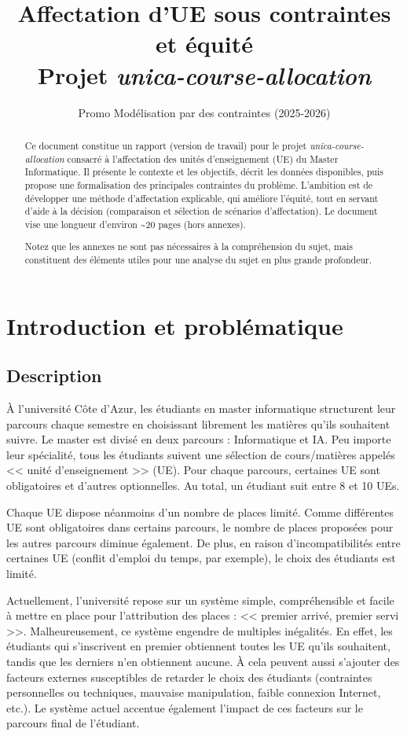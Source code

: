 \documentclass{rapport}
\title{Affectation d'UE sous contraintes et équité\\Projet \emph{unica-course-allocation}}
\author{Promo Modélisation par des contraintes (2025-2026)}
\date{}
\theoremstyle{definition}
\theoremstyle{remark}
\theoremstyle{plain}
\theoremstyle{definition}
\theoremstyle{definition}
\theoremstyle{remark}
\theoremstyle{definition}
\begin{document}
\maketitle

\begin{abstract}
Ce document constitue un rapport (version de travail) pour le projet \emph{unica-course-allocation} consacré à l'affectation des unités d'enseignement (UE) du Master Informatique.
Il présente le contexte et les objectifs, décrit les données disponibles, puis propose une formalisation des principales contraintes du problème.
L'ambition est de développer une méthode d'affectation explicable, qui améliore l'équité, tout en servant d'aide à la décision (comparaison et sélection de scénarios d'affectation).
Le document vise une longueur d'environ \textasciitilde{}20 pages (hors annexes).

Notez que les annexes ne sont pas nécessaires à la compréhension du sujet, mais constituent des éléments utiles pour une analyse du sujet en plus grande profondeur.
\end{abstract}

\clearpage
\tableofcontents
\clearpage

\section{Introduction et problématique}
\subsection{Description}
À l'université Côte d'Azur, les étudiants en master informatique structurent leur parcours chaque semestre en choisissant librement les matières qu'ils souhaitent suivre.
Le master est divisé en deux parcours : Informatique et IA. Peu importe leur spécialité, tous les étudiants suivent une sélection de cours/matières appelés << unité d'enseignement >> (UE).
Pour chaque parcours, certaines UE sont obligatoires et d'autres optionnelles. Au total, un étudiant suit entre 8 et 10 UEs.

Chaque UE dispose néanmoins d'un nombre de places limité. Comme différentes UE sont obligatoires dans certains parcours, le nombre de places proposées pour les autres parcours diminue également.
De plus, en raison d'incompatibilités entre certaines UE (conflit d'emploi du temps, par exemple), le choix des étudiants est limité.

Actuellement, l'université repose sur un système simple, compréhensible et facile à mettre en place pour l'attribution des places : << premier arrivé, premier servi >>.
Malheureusement, ce système engendre de multiples inégalités. En effet, les étudiants qui s'inscrivent en premier obtiennent toutes les UE qu'ils souhaitent, tandis que les derniers n'en obtiennent aucune.
À cela peuvent aussi s'ajouter des facteurs externes susceptibles de retarder le choix des étudiants (contraintes personnelles ou techniques, mauvaise manipulation, faible connexion Internet, etc.).
Le système actuel accentue également l'impact de ces facteurs sur le parcours final de l'étudiant.
\end{document}
